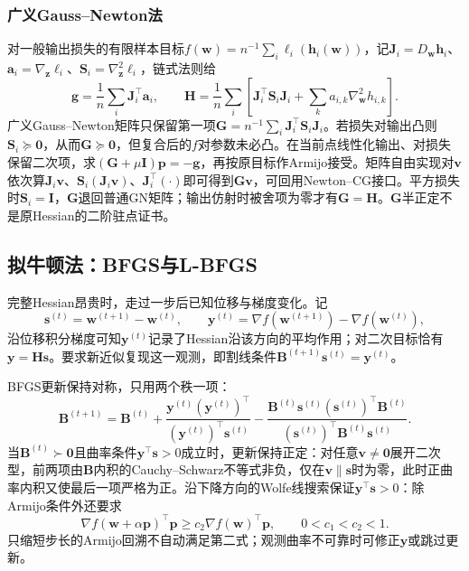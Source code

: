 \subsubsection{广义Gauss--Newton法}

对一般输出损失的有限样本目标$f(\bm w)=n^{-1}\sum_i\ell_i(\bm h_i(\bm w))$，记$\bm J_i=D_{\bm w}\bm h_i$、$\bm a_i=\nabla_{\bm z}\ell_i$、$\bm S_i=\nabla_{\bm z}^2\ell_i$，链式法则给
\[
 \bm g=\frac1n\sum_i\bm J_i^\top\bm a_i,\qquad
 \bm H=\frac1n\sum_i\left[\bm J_i^\top\bm S_i\bm J_i
 +\sum_k a_{i,k}\nabla_{\bm w}^2h_{i,k}\right].
\]
广义Gauss--Newton矩阵只保留第一项$\bm G=n^{-1}\sum_i\bm J_i^\top\bm S_i\bm J_i$。若损失对输出凸则$\bm S_i\succeq\bm0$，从而$\bm G\succeq\bm0$，但复合后的$f$对参数未必凸。在当前点线性化输出、对损失保留二次项，求$(\bm G+\mu\bm I)\bm p=-\bm g$，再按原目标作Armijo接受。矩阵自由实现对$\bm v$依次算$\bm J_i\bm v$、$\bm S_i(\bm J_i\bm v)$、$\bm J_i^\top(\cdot)$即可得到$\bm G\bm v$，可回用Newton--CG接口。平方损失时$\bm S_i=\bm I$，$\bm G$退回普通GN矩阵；输出仿射时被舍项为零才有$\bm G=\bm H$。$\bm G$半正定不是原Hessian的二阶驻点证书。

\subsection{拟牛顿法：BFGS与L-BFGS}
\label{sec:opt-quasi-newton}

完整Hessian昂贵时，走过一步后已知位移与梯度变化。记
\[
 \bm s^{(t)}=\bm w^{(t+1)}-\bm w^{(t)},\qquad
 \bm y^{(t)}=\nabla f(\bm w^{(t+1)})-\nabla f(\bm w^{(t)}),
\]
沿位移积分梯度可知$\bm y^{(t)}$记录了Hessian沿该方向的平均作用；对二次目标恰有$\bm y=\bm H\bm s$。要求新近似复现这一观测，即割线条件$\bm B^{(t+1)}\bm s^{(t)}=\bm y^{(t)}$。

BFGS更新保持对称，只用两个秩一项：
\begin{equation}
  \bm{B}^{(t+1)}
  =\bm{B}^{(t)}
  +\frac{\bm{y}^{(t)}(\bm{y}^{(t)})^{\top}}
         {(\bm{y}^{(t)})^{\top}\bm{s}^{(t)}}
  -\frac{\bm{B}^{(t)}\bm{s}^{(t)}(\bm{s}^{(t)})^{\top}\bm{B}^{(t)}}
         {(\bm{s}^{(t)})^{\top}\bm{B}^{(t)}\bm{s}^{(t)}}.
  \label{eq:opt-bfgs-update}
\end{equation}
当$\bm B^{(t)}\succ\bm0$且曲率条件$\bm y^\top\bm s>0$成立时，更新保持正定：对任意$\bm v\neq\bm0$展开二次型，前两项由$\bm B$内积的Cauchy--Schwarz不等式非负，仅在$\bm v\parallel\bm s$时为零，此时正曲率内积又使最后一项严格为正。沿下降方向的Wolfe线搜索保证$\bm y^\top\bm s>0$：除Armijo条件外还要求
\[
 \nabla f(\bm w+\alpha\bm p)^\top\bm p\geq c_2\nabla f(\bm w)^\top\bm p,
 \qquad 0<c_1<c_2<1.
\]
只缩短步长的Armijo回溯不自动满足第二式；观测曲率不可靠时可修正$\bm y$或跳过更新。

